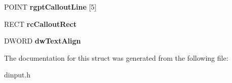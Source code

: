 \begin{DoxyCompactItemize}
\item 
\hypertarget{struct___d_i_d_e_v_i_c_e_i_m_a_g_e_i_n_f_o_w_aae5011d680c8ab5779dc4bd2e02932a9}{P\-O\-I\-N\-T {\bfseries rgpt\-Callout\-Line} \mbox{[}5\mbox{]}}\label{struct___d_i_d_e_v_i_c_e_i_m_a_g_e_i_n_f_o_w_aae5011d680c8ab5779dc4bd2e02932a9}

\item 
\hypertarget{struct___d_i_d_e_v_i_c_e_i_m_a_g_e_i_n_f_o_w_a6e20bdec81422b4d28ea8963ade5de1b}{R\-E\-C\-T {\bfseries rc\-Callout\-Rect}}\label{struct___d_i_d_e_v_i_c_e_i_m_a_g_e_i_n_f_o_w_a6e20bdec81422b4d28ea8963ade5de1b}

\item 
\hypertarget{struct___d_i_d_e_v_i_c_e_i_m_a_g_e_i_n_f_o_w_aee06744ce57ce8a0ae99d76aeba23001}{D\-W\-O\-R\-D {\bfseries dw\-Text\-Align}}\label{struct___d_i_d_e_v_i_c_e_i_m_a_g_e_i_n_f_o_w_aee06744ce57ce8a0ae99d76aeba23001}

\end{DoxyCompactItemize}


The documentation for this struct was generated from the following file\-:\begin{DoxyCompactItemize}
\item 
dinput.\-h\end{DoxyCompactItemize}
